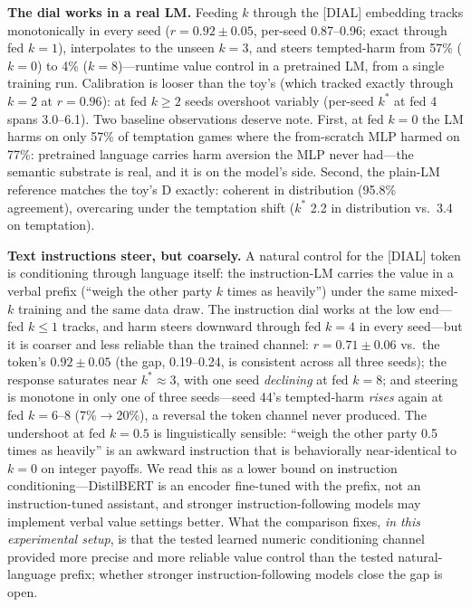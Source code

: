 \documentclass[manuscript, screen, review]{jair}
\begin{document}
\textbf{The dial works in a real LM.} Feeding $k$ through the [DIAL] embedding tracks monotonically in every seed ($r{=}0.92{\pm}0.05$, per-seed 0.87--0.96; exact through fed $k{=}1$), interpolates to the unseen $k{=}3$, and steers tempted-harm from 57\% ($k{=}0$) to 4\% ($k{=}8$)---runtime value control in a pretrained LM, from a single training run. Calibration is looser than the toy's (which tracked exactly through $k{=}2$ at $r{=}0.96$): at fed $k \geq 2$ seeds overshoot variably (per-seed $k^*$ at fed 4 spans 3.0--6.1). Two baseline observations deserve note. First, at fed $k{=}0$ the LM harms on only 57\% of temptation games where the from-scratch MLP harmed on 77\%: pretrained language carries harm aversion the MLP never had---the semantic substrate is real, and it is on the model's side. Second, the plain-LM reference matches the toy's D exactly: coherent in distribution (95.8\% agreement), overcaring under the temptation shift ($k^*$ 2.2 in distribution vs.\ 3.4 on temptation).

\textbf{Text instructions steer, but coarsely.} A natural control for the [DIAL] token is conditioning through language itself: the instruction-LM carries the value in a verbal prefix (``weigh the other party $k$ times as heavily'') under the same mixed-$k$ training and the same data draw. The instruction dial works at the low end---fed $k \leq 1$ tracks, and harm steers downward through fed $k{=}4$ in every seed---but it is coarser and less reliable than the trained channel: $r = 0.71 \pm 0.06$ vs.\ the token's $0.92 \pm 0.05$ (the gap, 0.19--0.24, is consistent across all three seeds); the response saturates near $k^{*} \approx 3$, with one seed \emph{declining} at fed $k{=}8$; and steering is monotone in only one of three seeds---seed 44's tempted-harm \emph{rises} again at fed $k{=}6$--$8$ (7\%$\to$20\%), a reversal the token channel never produced. The undershoot at fed $k{=}0.5$ is linguistically sensible: ``weigh the other party 0.5 times as heavily'' is an awkward instruction that is behaviorally near-identical to $k{=}0$ on integer payoffs. We read this as a lower bound on instruction conditioning---DistilBERT is an encoder fine-tuned with the prefix, not an instruction-tuned assistant, and stronger instruction-following models may implement verbal value settings better. What the comparison fixes, \emph{in this experimental setup}, is that the tested learned numeric conditioning channel provided more precise and more reliable value control than the tested natural-language prefix; whether stronger instruction-following models close the gap is open.
\end{document}
